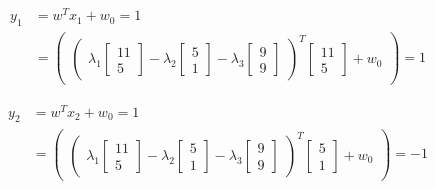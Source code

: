 \documentclass[12pt]{report}
\begin{document}
\begin{equation*}
	\begin{aligned}
		y_{1} & =  w^T x_{1} + w_{0} = 1             \\
		      & = \begin{pmatrix}
			          \begin{pmatrix}
				\lambda_{1}\begin{bmatrix}
					           11 \\
					           5
				           \end{bmatrix} -

				\lambda_{2}\begin{bmatrix}
					           5 \\
					           1
				           \end{bmatrix} -

				\lambda_{3}\begin{bmatrix}
					           9 \\
					           9
				           \end{bmatrix}
			\end{pmatrix}  ^ T
			          \begin{bmatrix}
				11 \\
				5
			\end{bmatrix} + w_{0}
		          \end{pmatrix} = 1
	\end{aligned}
\end{equation*}

\begin{equation*}
	\begin{aligned}
		y_{2} & =  w^T x_{2} + w_{0} = 1             \\
		      & = \begin{pmatrix}
			          \begin{pmatrix}
				\lambda_{1}\begin{bmatrix}
					           11 \\
					           5
				           \end{bmatrix} -

				\lambda_{2}\begin{bmatrix}
					           5 \\
					           1
				           \end{bmatrix} -

				\lambda_{3}\begin{bmatrix}
					           9 \\
					           9
				           \end{bmatrix}
			\end{pmatrix}  ^ T
			          \begin{bmatrix}
				5 \\
				1
			\end{bmatrix} + w_{0}
		          \end{pmatrix} = -1
	\end{aligned}
\end{equation*}
\end{document}
